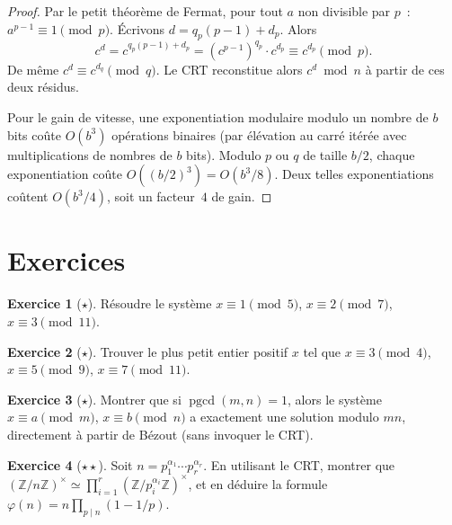 \documentclass[12pt,a4paper,openany]{book}
\theoremstyle{definition}
\newtheorem{exercice}{Exercice}[chapter]
\theoremstyle{plain}
\theoremstyle{remark}
\newcommand{\Z}{\mathbb{Z}}
\DeclareMathOperator{\pgcd}{pgcd}
\begin{document}
\begin{proof}
Par le petit théorème de Fermat, pour tout $a$ non divisible par $p$~:
$a^{p-1} \equiv 1 \pmod{p}$. Écrivons $d = q_p(p-1) + d_p$. Alors
\[
  c^d = c^{q_p(p-1) + d_p} = (c^{p-1})^{q_p} \cdot c^{d_p}
      \equiv c^{d_p} \pmod{p}.
\]
De même $c^d \equiv c^{d_q} \pmod{q}$. Le CRT reconstitue alors
$c^d \bmod n$ à partir de ces deux résidus.

Pour le gain de vitesse, une exponentiation modulaire modulo un nombre de $b$ bits
coûte $O(b^3)$ opérations binaires (par élévation au carré itérée avec multiplications
de nombres de $b$ bits). Modulo $p$ ou $q$ de taille $b/2$, chaque exponentiation
coûte $O((b/2)^3) = O(b^3/8)$. Deux telles exponentiations coûtent $O(b^3/4)$,
soit un facteur~$4$ de gain.
\end{proof}

\section{Exercices}
\label{sec:crt:exercices}

\begin{exercice}[$\star$]
\label{exo:crt-1}
Résoudre le système
$x \equiv 1 \pmod{5}$, $x \equiv 2 \pmod{7}$, $x \equiv 3 \pmod{11}$.
\end{exercice}

\begin{exercice}[$\star$]
\label{exo:crt-2}
Trouver le plus petit entier positif $x$ tel que
$x \equiv 3 \pmod{4}$, $x \equiv 5 \pmod{9}$, $x \equiv 7 \pmod{11}$.
\end{exercice}

\begin{exercice}[$\star$]
\label{exo:crt-3}
Montrer que si $\pgcd(m, n) = 1$, alors le système
$x \equiv a \pmod{m}$, $x \equiv b \pmod{n}$ a exactement une solution
modulo $mn$, directement à partir de Bézout (sans invoquer le CRT).
\end{exercice}

\begin{exercice}[$\star\star$]
\label{exo:crt-4}
Soit $n = p_1^{\alpha_1} \cdots p_r^{\alpha_r}$. En utilisant le CRT,
montrer que $(\Z/n\Z)^\times \simeq \prod_{i=1}^r (\Z/p_i^{\alpha_i}\Z)^\times$,
et en déduire la formule $\varphi(n) = n \prod_{p \mid n}(1 - 1/p)$.
\end{exercice}
\end{document}
